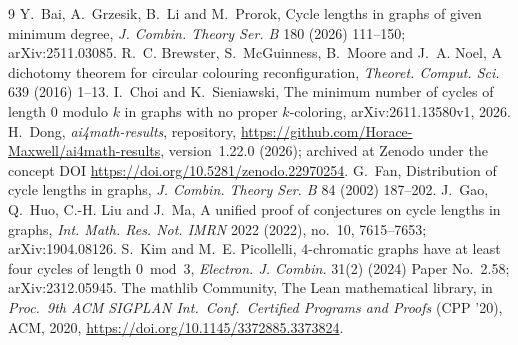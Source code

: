 \documentclass[11pt]{article}
\theoremstyle{remark}
\newcommand{\repoversion}{1.22.0}
\begin{document}
\begin{thebibliography}{9}
 Y.~Bai, A.~Grzesik, B.~Li and M.~Prorok, Cycle lengths in graphs
of given minimum degree, \emph{J. Combin. Theory Ser. B} 180 (2026) 111--150;
arXiv:2511.03085.
 R.~C. Brewster, S.~McGuinness, B.~Moore and J.~A. Noel,
A dichotomy theorem for circular colouring reconfiguration,
\emph{Theoret. Comput. Sci.} 639 (2016) 1--13.
 I.~Choi and K.~Sieniawski, The minimum number of cycles of length
$0$ modulo $k$ in graphs with no proper $k$-coloring, arXiv:2611.13580v1, 2026.
 H.~Dong, \emph{ai4math-results}, repository,
\url{https://github.com/Horace-Maxwell/ai4math-results}, version~\repoversion{}
(2026); archived at Zenodo under the concept DOI
\url{https://doi.org/10.5281/zenodo.22970254}.
 G.~Fan, Distribution of cycle lengths in graphs, \emph{J. Combin.
Theory Ser. B} 84 (2002) 187--202.
 J.~Gao, Q.~Huo, C.-H. Liu and J.~Ma, A unified proof of
conjectures on cycle lengths in graphs, \emph{Int. Math. Res. Not. IMRN}
2022 (2022), no.~10, 7615--7653; arXiv:1904.08126.
 S.~Kim and M.~E. Picollelli, $4$-chromatic graphs have at least
four cycles of length $0 \bmod 3$, \emph{Electron. J. Combin.} 31(2) (2024)
Paper No.~2.58; arXiv:2312.05945.
The mathlib Community, The Lean mathematical library, in \emph{Proc.\ 9th ACM
SIGPLAN Int.\ Conf.\ Certified Programs and Proofs} (CPP '20), ACM, 2020,
\url{https://doi.org/10.1145/3372885.3373824}.
\end{thebibliography}
\end{document}
